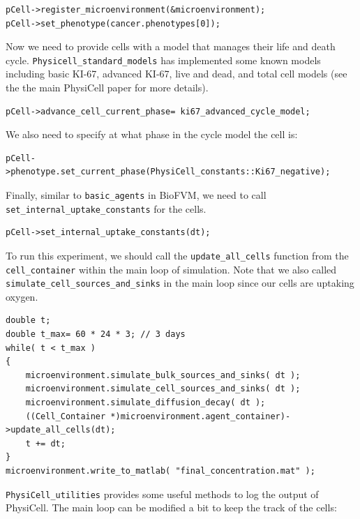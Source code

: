 \documentclass[11pt]{article}
\begin{document}
\begin{verbatim}
pCell->register_microenvironment(&microenvironment);
pCell->set_phenotype(cancer.phenotypes[0]);
\end{verbatim}

Now we need to provide cells with a model that manages their life and death cycle. \verb:Physicell_standard_models: has implemented some known
models including basic KI-67, advanced KI-67, live and dead, and total cell models (see the the main PhysiCell paper for more details).

\begin{verbatim}
pCell->advance_cell_current_phase= ki67_advanced_cycle_model;
\end{verbatim}

We also need to specify at what phase in the cycle model the cell is:

\begin{verbatim}
pCell->phenotype.set_current_phase(PhysiCell_constants::Ki67_negative);
\end{verbatim}

Finally, similar to \verb:basic_agents: in BioFVM, we need to call \verb:set_internal_uptake_constants: for the cells.

\begin{verbatim}
pCell->set_internal_uptake_constants(dt);
\end{verbatim}

To run this experiment, we should call the \verb:update_all_cells: function from the \verb:cell_container:
within the main loop of simulation. Note that we also called \verb:simulate_cell_sources_and_sinks: in the main
loop since our cells are uptaking oxygen.


\begin{verbatim}
double t;
double t_max= 60 * 24 * 3; // 3 days
while( t < t_max )
{
    microenvironment.simulate_bulk_sources_and_sinks( dt );
    microenvironment.simulate_cell_sources_and_sinks( dt );
    microenvironment.simulate_diffusion_decay( dt );
    ((Cell_Container *)microenvironment.agent_container)->update_all_cells(dt);	
    t += dt;
}
microenvironment.write_to_matlab( "final_concentration.mat" );
\end{verbatim}

\verb:PhysiCell_utilities: provides some useful methods to log the output of PhysiCell. The main loop can be modified a bit
to keep the track of the cells:
\end{document}
